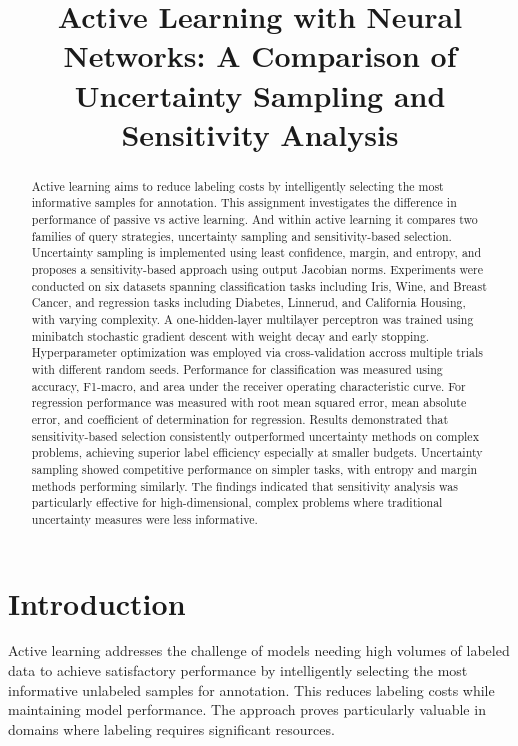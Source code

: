 \documentclass[conference]{IEEEtran}
\title{Active Learning with Neural Networks: A Comparison of Uncertainty Sampling and Sensitivity Analysis}
\author{\IEEEauthorblockN{\nameinit\ \surname\ \, (\studentnumber)}
\IEEEauthorblockA{Stellenbosch University\\ Machine Learning 441\\ \emailaddr}}
\begin{document}
\maketitle

\begin{abstract}
Active learning aims to reduce labeling costs by intelligently selecting the most informative samples for annotation. This assignment investigates the difference in performance of passive vs active learning. And within active learning it compares two families of query strategies, uncertainty sampling and sensitivity-based selection. Uncertainty sampling is implemented using least confidence, margin, and entropy, and proposes a sensitivity-based approach using output Jacobian norms. Experiments were conducted on six datasets spanning classification tasks including Iris, Wine, and Breast Cancer, and regression tasks including Diabetes, Linnerud, and California Housing, with varying complexity. A one-hidden-layer multilayer perceptron was trained using minibatch stochastic gradient descent with weight decay and early stopping. Hyperparameter optimization was employed via cross-validation accross multiple trials with different random seeds. Performance for classification was measured using accuracy, F1-macro, and area under the receiver operating characteristic curve. For regression performance was measured with root mean squared error, mean absolute error, and coefficient of determination for regression. Results demonstrated that sensitivity-based selection consistently outperformed uncertainty methods on complex problems, achieving superior label efficiency especially at smaller budgets. Uncertainty sampling showed competitive performance on simpler tasks, with entropy and margin methods performing similarly. The findings indicated that sensitivity analysis was particularly effective for high-dimensional, complex problems where traditional uncertainty measures were less informative.
\end{abstract}

\section{Introduction}

Active learning addresses the challenge of models needing high volumes of labeled data to achieve satisfactory performance by intelligently selecting the most informative unlabeled samples for annotation. This reduces labeling costs while maintaining model performance. The approach proves particularly valuable in domains where labeling requires significant resources.
\end{document}
